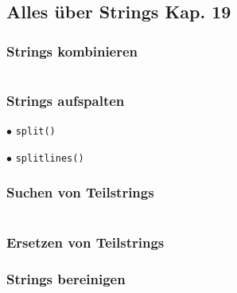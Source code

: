 \begin{minipage}[t]{0.39\textwidth}
	\subsection{Alles über Strings \tiny{Kap. 19}}
	
	\subsubsection{Strings kombinieren}
	
\end{minipage}
\begin{minipage}[t]{0.02\textwidth} $ \quad $\end{minipage}
\begin{minipage}[t]{0.59\textwidth}
	\subsubsection{Strings aufspalten}
	$\bullet$ \texttt{split()}
	
	$\bullet$ \texttt{splitlines()}
	
\end{minipage}


\begin{minipage}[t]{0.49\textwidth}
	\subsubsection{Suchen von Teilstrings}
	
\end{minipage}
\begin{minipage}[t]{0.02\textwidth} $ \quad $\end{minipage}
\begin{minipage}[t]{0.49\textwidth}
	\subsubsection{Ersetzen von Teilstrings}
	
\end{minipage}

\subsubsection{Strings bereinigen}


